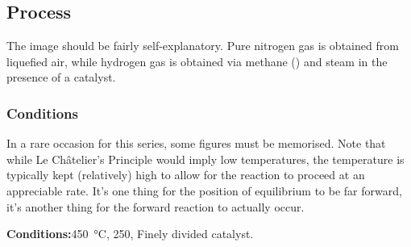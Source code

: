 

		\pagebreak
		\subsection{Process}



			The image should be fairly self-explanatory. Pure nitrogen gas is obtained from liquefied air, while hydrogen gas is obtained
			via methane () and steam in the presence of a catalyst.

			\subsubsection{Conditions}

				In a rare occasion for this series, some figures must be memorised. Note that while Le Châtelier's Principle would imply
				low temperatures, the temperature is typically kept (relatively) high to allow for the reaction to proceed at an appreciable
				rate. It's one thing for the position of equilibrium to be far forward, it's another thing for the forward reaction to
				actually occur.

				\vspace{1.5em}
				\vbox{\textbf{Conditions:}\tabto{35mm}\SI{450}{\celsius}, \SI{250}{\atm}, Finely divided  catalyst.}




















